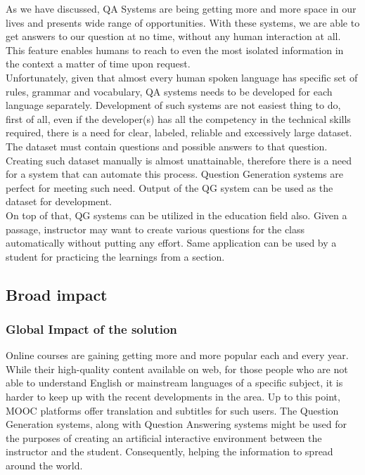 \documentclass{mefsdp}
\begin{document}
	As we have discussed, QA Systems are being getting more and more space in our lives and presents wide range of opportunities. With these systems, we are able to get answers to our question at no time, without any human interaction at all. This feature enables humans to reach to even the most isolated information in the context a matter of time upon request.\\
	
	Unfortunately, given that almost every human spoken language has specific set of rules, grammar and vocabulary, QA systems needs to be developed for each language separately. Development of such systems are not easiest thing to do, first of all, even if the developer(s) has all the competency in the technical skills required, there is a need for clear, labeled, reliable and excessively large dataset. The dataset must contain questions and possible answers to that question. Creating such dataset manually is almost unattainable, therefore there is a need for a system that can automate this process. Question Generation systems are perfect for meeting such need. Output of the QG system can be used as the dataset for development.\\
	
	On top of that, QG systems can be utilized in the education field also. Given a passage, instructor may want to create various questions for the class automatically without putting any effort. Same application can be used by a student for practicing the learnings from a section.

	
	\subsection{Broad impact}
	\subsubsection{Global Impact of the solution}
	Online courses are gaining getting more and more popular each and every year. While their high-quality content available on web, for those people who are not able to understand English or mainstream languages of a specific subject, it is harder to keep up with the recent developments in the area. Up to this point, MOOC platforms offer translation and subtitles for such users. The Question Generation systems, along with Question Answering systems might be used for the purposes of creating an artificial interactive environment between the instructor and the student. Consequently, helping the information to spread around the world.
	
\end{document}
